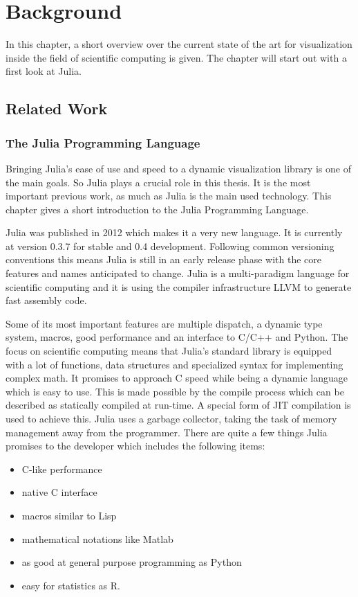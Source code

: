\section{Background}

In this chapter, a short overview over the current state of the art for visualization inside the field of scientific computing is given. The chapter will start out with a first look at Julia.

\subsection{Related Work}

\subsubsection{The Julia Programming Language}

Bringing Julia's ease of use and speed to a dynamic visualization library is one of the main goals.
So Julia plays a crucial role in this thesis. 
It is the most important previous work, as much as Julia is the main used technology.
This chapter gives a short introduction to the Julia Programming Language.

Julia was published in 2012 which makes it a very new language. It is currently at version 0.3.7 for stable and 0.4 development.
Following common versioning conventions this means Julia is still in an early release phase with the core features and names anticipated to change.
Julia is a multi-paradigm language for scientific computing and it is using the compiler infrastructure \ac{LLVM} to generate fast assembly code.

Some of its most important features are multiple dispatch, a dynamic type system, macros, good performance and an interface to C/C++ and Python.
The focus on scientific computing means that Julia's standard library is equipped with a lot of functions, data structures and specialized syntax for implementing complex math.
It promises to approach C speed while being a dynamic language which is easy to use.
This is made possible by the compile process which can be described as statically compiled at run-time. A special form of \ac{JIT} compilation is used to achieve this.
Julia uses a garbage collector, taking the task of memory management away from the programmer.
There are quite a few things Julia promises to the developer which includes the following items\cite{WhyJulia}:

\begin{itemize}
	\item C-like performance
	\item native C interface
	\item macros similar to Lisp
	\item mathematical notations like Matlab
	\item as good at general purpose programming as Python
	\item easy for statistics as R.
\end{itemize}

